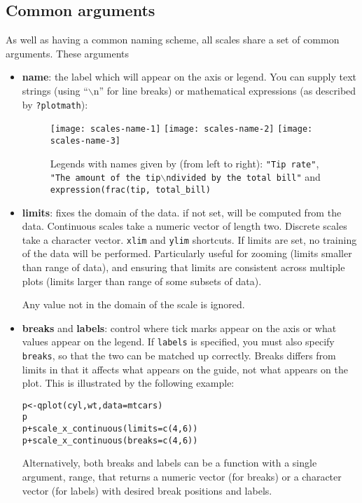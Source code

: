 \subsection{Common arguments}
\label{sub:scale_arguments}

As well as having a common naming scheme, all scales share a set of common arguments.  These arguments 

\begin{itemize}
  \item {\bf name}:  the label which will appear on the axis or legend. You can supply text strings (using ``$\backslash$n'' for line breaks) or mathematical expressions (as described by \verb|?plotmath|):
  
  \begin{figure}[htbp]
    \centering
      \texttt{[image: scales-name-1]}
      \texttt{[image: scales-name-2]}
      \texttt{[image: scales-name-3]}
    \caption{Legends with names given by (from left to right): {\tt "Tip rate"}, {\tt "The amount of the tip$\backslash$ndivided by the total bill"} and {\tt expression(frac(tip, total\_bill)} }
    \label{fig:label}
  \end{figure}
  

  \item {\bf limits}: fixes the domain of the data.  if not set, will be computed from the data.    Continuous scales take a numeric vector of length two.  Discrete scales take a character vector.  {\tt xlim} and {\tt ylim} shortcuts.  If limits are set, no training of the data will be performed.  Particularly useful for zooming (limits smaller than range of data), and ensuring that limits are consistent across multiple plots (limits larger than range of some subsets of data).  
  
  Any value not in the domain of the scale is ignored.

  \item {\bf breaks} and {\bf labels}: control where tick marks appear on the axis or what values appear on the legend.  If {\tt labels} is specified, you must also specify {\tt breaks}, so that the two can be matched up correctly.  Breaks differs from limits in that it affects what appears on the guide, not what appears on the plot.  This is illustrated by the following example:
  
  \begin{alltt}
    p <- qplot(cyl, wt, data = mtcars)
    p
    p + scale_x_continuous(limits = c(4, 6))
    p + scale_x_continuous(breaks = c(4, 6))
  \end{alltt}
  
  Alternatively, both breaks and labels can be a function with a single  argument, range, that returns a numeric vector (for breaks) or a character vector (for labels) with desired break positions and labels.
\end{itemize}

